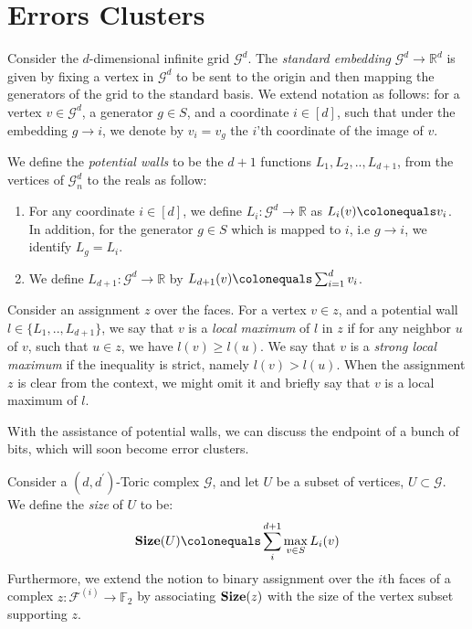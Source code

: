 \section{Errors Clusters}

\begin{definition}
  Consider the $d$-dimensional infinite grid $\mathcal{G}^{d}$. The \textit{standard embedding} $\mathcal{G}^{d} \rightarrow \mathbb{R}^{d}$ is given by fixing a vertex in $\mathcal{G}^{d}$ to be sent to the origin and then mapping the generators of the grid to the standard basis. We extend notation as follows: for a vertex $v \in \mathcal{G}^{d}$, a generator $g \in S$, and a coordinate $i \in [d]$, such that under the embedding $g \rightarrow i$, we denote by $v_{i} = v_{g}$ the $i$'th coordinate of the image of $v$.
\end{definition}

\begin{definition}
  We define the \textit{potential walls} to be the $d+1$ functions $L_{1},L_{2},..,L_{d+1}$, from the vertices of $\mathcal{G}_{n}^{d}$ to the reals as follow:
  \begin{enumerate}
    \item For any coordinate $i \in [d]$, we define $L_{i} \colon \mathcal{G}^{d} \rightarrow \mathbb{R}$ as $L_{i}(v) \colonequals v_{i}$. In addition, for the generator $g \in S$ which is mapped to $i$, i.e $g \rightarrow i $, we identify $L_{g} = L_{i}$. 
    \item We define $L_{d+1} \colon \mathcal{G}^{d} \rightarrow \mathbb{R}$ by $L_{d+1}(v) \colonequals \sum_{i = 1}^{d}v_{i}$.
  \end{enumerate}
  Consider an assignment $z$ over the faces. For a vertex $v \in z$, and a potential wall $l \in \{ L_{1},..,L_{d+1}\} $, we say that $v$ is a \textit{local maximum} of $l$ in $z$ if for any neighbor $u$ of $v$, such that $u \in z$, we have $l(v) \ge l(u)$. We say that $v$ is a \textit{strong local maximum} if the inequality is strict, namely $l(v) > l(u)$. When the assignment $z$ is clear from the context, we might omit it and briefly say that $v$ is a local maximum of $l$.

\end{definition}
With the assistance of potential walls, we can discuss the endpoint of a bunch of bits, which will soon become error clusters. 

\begin{definition}
Consider a $(d,d^{\prime})$-Toric complex $\mathcal{G}$, and let $U$ be a subset of vertices, $U \subset \mathcal{G}$. We define the \textit{size} of $U$ to be:
  \begin{equation*}
    \begin{split}
      \Size{U} \colonequals \sum_{i}^{d+1} \max_{v \in S} L_{i}(v) 
    \end{split}
  \end{equation*}
Furthermore, we extend the notion to binary assignment over the $i$th faces of a complex $z : \mathcal{F}^{(i)} \rightarrow \mathbb{F}_{2}$ by associating $\mathbf{Size}(z)$ with the size of the vertex subset supporting $z$.
\end{definition}

